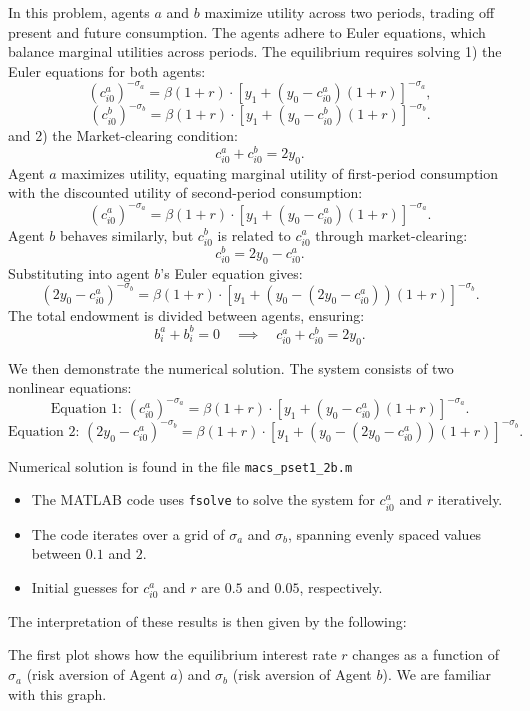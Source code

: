 \documentclass[12pt]{article}
\begin{document}
\begin{enumerate}
In this problem, agents $a$ and $b$ maximize utility across two periods, trading off present and future consumption. The agents adhere to {Euler equations}, which balance marginal utilities across periods. 
The equilibrium requires solving 1) the {Euler equations for both agents:}
    \[
    (c_{i0}^a)^{-\sigma_a} = \beta (1 + r) \cdot \left[ y_1 + (y_0 - c_{i0}^a)(1 + r) \right]^{-\sigma_a},
    \]
    \[
    (c_{i0}^b)^{-\sigma_b} = \beta (1 + r) \cdot \left[ y_1 + (y_0 - c_{i0}^b)(1 + r) \right]^{-\sigma_b}.
    \]
and 2) the {Market-clearing condition:}
    \[
    c_{i0}^a + c_{i0}^b = 2y_0.
    \]
Agent $a$ maximizes utility, equating marginal utility of first-period consumption with the discounted utility of second-period consumption:
\[
(c_{i0}^a)^{-\sigma_a} = \beta (1 + r) \cdot \left[ y_1 + (y_0 - c_{i0}^a)(1 + r) \right]^{-\sigma_a}.
\]
Agent $b$ behaves similarly, but $c_{i0}^b$ is related to $c_{i0}^a$ through market-clearing:
\[
c_{i0}^b = 2y_0 - c_{i0}^a.
\]
Substituting into agent $b$’s Euler equation gives:
\[
(2y_0 - c_{i0}^a)^{-\sigma_b} = \beta (1 + r) \cdot \left[ y_1 + (y_0 - (2y_0 - c_{i0}^a))(1 + r) \right]^{-\sigma_b}.
\]
The total endowment is divided between agents, ensuring:
\[
b_i^a + b_i^b = 0 \quad \implies \quad c_{i0}^a + c_{i0}^b = 2y_0.
\]

We then demonstrate the numerical solution. 
The system consists of two nonlinear equations:
\[
\text{Equation 1: } (c_{i0}^a)^{-\sigma_a} = \beta (1 + r) \cdot \left[ y_1 + (y_0 - c_{i0}^a)(1 + r) \right]^{-\sigma_a}.
\]
\[
\text{Equation 2: } (2y_0 - c_{i0}^a)^{-\sigma_b} = \beta (1 + r) \cdot \left[ y_1 + (y_0 - (2y_0 - c_{i0}^a))(1 + r) \right]^{-\sigma_b}.
\]

{Numerical solution} is found in the file \verb!macs_pset1_2b.m!
\begin{itemize}
    \item The MATLAB code uses \texttt{fsolve} to solve the system for $c_{i0}^a$ and $r$ iteratively.
    \item The code iterates over a grid of $\sigma_a$ and $\sigma_b$, spanning evenly spaced values between $0.1$ and $2$.
    \item Initial guesses for $c_{i0}^a$ and $r$ are $0.5$ and $0.05$, respectively.
\end{itemize}

The interpretation of these results is then given by the following: 

The first plot shows how the equilibrium interest rate $r$ changes as a function of $\sigma_a$ (risk aversion of Agent $a$) and $\sigma_b$ (risk aversion of Agent $b$). We are familiar with this graph. 


\end{enumerate}
\end{document}
